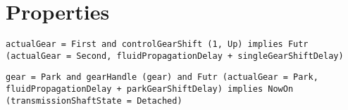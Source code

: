 \section{Properties}
\label{Section:Properties}

\begin{lstlisting}[language=TRIO,basicstyle=\small,breaklines,breakatwhitespace,frame=single,caption=Property 1,label=Code:Property1]
actualGear = First and controlGearShift (1, Up) implies Futr (actualGear = Second, fluidPropagationDelay + singleGearShiftDelay)
\end{lstlisting}

\begin{lstlisting}[language=TRIO,basicstyle=\small,breaklines,breakatwhitespace,frame=single,caption=Property 2,label=Code:Property2]
gear = Park and gearHandle (gear) and Futr (actualGear = Park, fluidPropagationDelay + parkGearShiftDelay) implies NowOn (transmissionShaftState = Detached)
\end{lstlisting}
